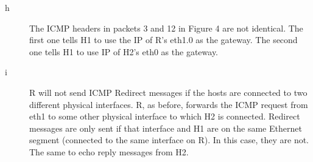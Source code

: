 \documentclass[a4paper]{article}
\begin{document}
\begin{description}
	\item[h] The ICMP headers in packets 3 and 12 in Figure 4 are not identical. The first one tells H1 to use the IP of R's eth1.0 as the gateway. The second one tells H1 to use IP of H2's eth0 as the gateway.
	\item[i] R will not send ICMP Redirect messages if the hosts are connected to two different physical interfaces. R, as before, forwards the ICMP request from eth1 to some other physical interface to which H2 is connected. Redirect messages are only sent if that interface and H1 are on the same Ethernet segment (connected to the same interface on R). In this case, they are not.\\
	The same to echo reply messages from H2.
\end{description}
\end{document}
